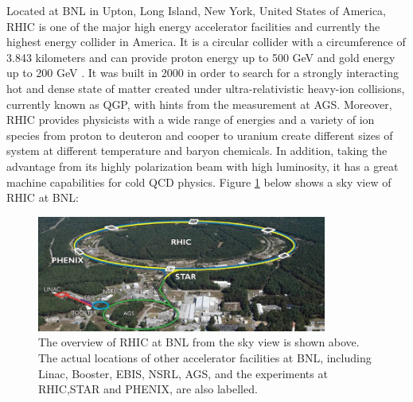 Located at BNL in Upton, Long Island, New York, United States of America, RHIC is one of the major high energy accelerator facilities and currently the highest energy collider in America. It is a circular collider with a circumference of 3.843 kilometers and can provide proton energy up to 500 GeV and gold energy up to 200 GeV \cite{RHICReport}. It was built in 2000 in order to search for a strongly interacting hot and dense state of matter created under ultra-relativistic heavy-ion collisions, currently known as QGP, with hints from the measurement at AGS. Moreover, RHIC provides physicists with a wide range of energies and a variety of ion species from proton to deuteron and cooper to uranium create different sizes of system at different temperature and baryon chemicals. In addition, taking the advantage from its highly polarization beam with high luminosity, it has a great machine capabilities for cold QCD physics. Figure \ref{RHIC} below shows a sky view of RHIC at BNL:


\begin{figure}[hbtp]
\begin{center}
\includegraphics[width=0.85\textwidth]{Figures/Chapter1/RHIC.jpg}
\caption{The overview of RHIC at BNL from the sky view is shown above. The actual locations of other accelerator facilities at BNL, including Linac, Booster, EBIS, NSRL, AGS, and the experiments at RHIC,STAR and PHENIX, are also labelled.}
\label{RHIC}
\end{center}
\end{figure} 

